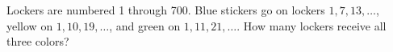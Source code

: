 Lockers are numbered 1 through 700. Blue stickers go on lockers $1,7,13,\ldots$, yellow on $1,10,19,\ldots$, and green on $1,11,21,\ldots$. How many lockers receive all three colors?
